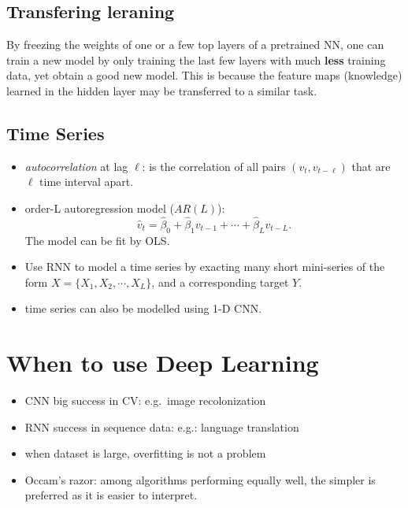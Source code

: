 \documentclass[
  letterpaper,
  DIV=11,
  numbers=noendperiod]{scrreprt}
\providecommand{\tightlist}{%
  \setlength{\itemsep}{0pt}\setlength{\parskip}{0pt}}\usepackage{longtable,booktabs,array}
\begin{document}
\subsection{Transfering leraning}\label{transfering-leraning}

By freezing the weights of one or a few top layers of a pretrained NN,
one can train a new model by only training the last few layers with much
\textbf{less} training data, yet obtain a good new model. This is
because the feature maps (knowledge) learned in the hidden layer may be
transferred to a similar task.

\subsection{Time Series}\label{time-series}

\begin{itemize}
\tightlist
\item
  \emph{autocorrelation} at lag \(\ell\): is the correlation of all
  pairs \((v_t, v_{t-\ell})\) that are \(\ell\) time interval apart.
\item
  order-L autoregression model (\(AR(L)\)): \[
  \hat{v}_t= \hat{\beta}_0 + \hat{\beta}_1 v_{t-1} + \cdots +  \hat{\beta}_L v_{t-L}. 
  \] The model can be fit by OLS.
\item
  Use RNN to model a time series by exacting many short mini-series of
  the form \(X=\{ X_1, X_2, \cdots, X_L\}\), and a corresponding target
  \(Y\).
\item
  time series can also be modelled using 1-D CNN.
\end{itemize}

\section{When to use Deep Learning}\label{when-to-use-deep-learning}

\begin{itemize}
\tightlist
\item
  CNN big success in CV: e.g.~image recolonization
\item
  RNN success in sequence data: e.g.: language translation
\item
  when dataset is large, overfitting is not a problem
\item
  Occam's razor: among algorithms performing equally well, the simpler
  is preferred as it is easier to interpret.
\end{itemize}
\end{document}
